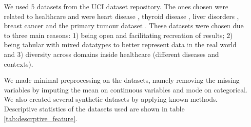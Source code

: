 

We used 5 datasets from the UCI dataset repository. The ones chosen were related to healthcare and were heart disease \cite{misc_heart_disease_45}, thyroid disease \cite{misc_thyroid_disease_102}, liver disorders \cite{misc_liver_disorders_60}, breast cancer \cite{misc_breast_cancer_wisconsin_diagnostic_17} and the primary tumour dataset \cite{misc_primary_tumor_83}. These datasets were chosen due to three main reasons: 1) being open and facilitating recreation of results; 2) being tabular with mixed datatypes to better represent data in the real world and 3) diversity across domains inside healthcare (different diseases and contexts).

We made minimal preprocessing on the datasets, namely removing the missing variables by imputing the mean on continuous variables and mode on categorical.
We also created several synthetic datasets by applying known methods. Descriptive statistics of the datasets used are shown in table \ref{tab:descrptive_feature}.


